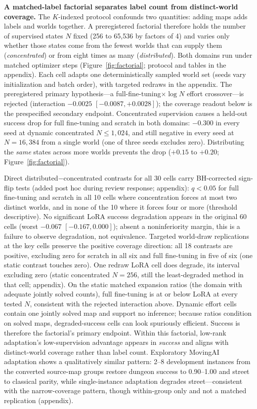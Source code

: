 \documentclass[letterpaper]{article} %
\begin{document}
\textbf{A matched-label factorial separates label count from distinct-world coverage.} The $K$-indexed protocol confounds two quantities: adding maps adds labels and worlds together. A preregistered factorial therefore holds the number of supervised states $N$ fixed (256 to 65{,}536 by factors of 4) and varies only whether those states come from the fewest worlds that can supply them (\emph{concentrated}) or from eight times as many (\emph{distributed}). Both domains run under matched optimizer steps (Figure~\ref{fig:factorial}; protocol and tables in the appendix). Each cell adapts one deterministically sampled world set (seeds vary initialization and batch order), with targeted redraws in the appendix. The preregistered primary hypothesis---a full-fine-tuning$\times\log N$ effort crossover---is rejected (interaction $-0.0025$ $[-0.0087, +0.0028]$); the coverage readout below is the prespecified secondary endpoint. Concentrated supervision causes a held-out success drop for full fine-tuning and scratch in both domains: $-0.300$ in every seed at dynamic concentrated $N \leq 1{,}024$, and still negative in every seed at $N{=}16{,}384$ from a single world (one of three seeds excludes zero). Distributing the \emph{same} states across more worlds prevents the drop ($+0.15$ to $+0.20$; Figure~\ref{fig:factorial}).

Direct distributed$-$concentrated contrasts for all 30 cells carry BH-corrected sign-flip tests (added post hoc during review response; appendix): $q{<}0.05$ for full fine-tuning and scratch in all 10 cells where concentration forces at most two distinct worlds, and in none of the 10 where it forces four or more (threshold descriptive). No significant LoRA success degradation appears in the original 60 cells (worst $-0.067$ $[-0.167, 0.000]$); absent a noninferiority margin, this is a failure to observe degradation, not equivalence. Targeted world-draw replications at the key cells preserve the positive coverage direction: all 18 contrasts are positive, excluding zero for scratch in all six and full fine-tuning in five of six (one static contrast touches zero). One redraw LoRA cell does degrade, its interval excluding zero (static concentrated $N{=}256$, still the least-degraded method in that cell; appendix). On the static matched expansion ratios (the domain with adequate jointly solved counts), full fine-tuning is at or below LoRA at every tested $N$, consistent with the rejected interaction above. Dynamic effort cells contain one jointly solved map and support no inference; because ratios condition on solved maps, degraded-success cells can look spuriously efficient. Success is therefore the factorial's primary endpoint. Within this factorial, low-rank adaptation's low-supervision advantage appears in \emph{success} and aligns with distinct-world coverage rather than label count. Exploratory MovingAI adaptation shows a qualitatively similar pattern: 2--8 development instances from the converted source-map groups restore dungeon success to 0.90--1.00 and street to classical parity, while single-instance adaptation degrades street---consistent with the narrow-coverage pattern, though within-group only and not a matched replication (appendix).
\end{document}
